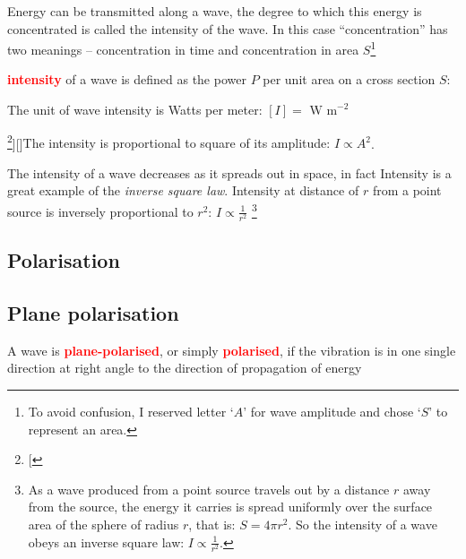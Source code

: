\documentclass[a4paper,12pt]{book}
\newcounter{example}[chapter]
\newcommand{\piste}{{\fontencoding{U}\fontfamily{futs}\selectfont\char 49\relax}}
\newenvironment{ilight}
  {\centering
  	\vspace*{6pt}
  	\begin{tcolorbox}[colframe=Gray,colback=LightGrey!15]
  \setlength{\baselineskip}{\baselineskip}%
  }
  {\end{tcolorbox}\vspace*{-4pt}}
\newcommand{\keypoint}[1]{\textbf{\textcolor{red}{#1}}}
\newcommand{\sidenote}[1]{\footnote{#1}}
\newcommand{\tcbhighmath}[1]{\boxed{#1}}
\newcommand{\piste}{\textsuperscript{$\star$}}
\newcommand{\keypoint}[1]{\textbf{\textcolor{red}{#1}}}
\begin{document}
Energy can be transmitted along a wave, the degree to which this energy is concentrated is called the intensity of the wave. In this case ``concentration'' has two meanings -- concentration in time and concentration in area $S$\footnote{To avoid confusion, I reserved letter `$A$' for wave amplitude and chose `$S$' to represent an area.}

\begin{ilight}
	\centering \keypoint{intensity} of a wave is defined as the power $P$ per unit area on a cross section $S$: \index{wave intensity}
\end{ilight}

The unit of wave intensity is Watts per meter: $[I] = ^{-2}$

\sidenote[][]{\piste The intensity is proportional to square of its amplitude: $\boxed{I \propto A^2}$}.

The intensity of a wave decreases as it spreads out in space, in fact Intensity is a great example of the \emph{inverse square law}. Intensity at distance of $r$ from a point source is inversely proportional to $r^2$: $\tcbhighmath{I \propto \frac{1}{r^2}}$
\footnote{As a wave produced from a point source travels out by a distance $r$ away from the source, the energy it carries is spread uniformly over the surface area of the sphere of radius $r$, that is: $S=4\pi r^2$. So the intensity of a wave obeys an inverse square law: $I \propto \frac{1}{r^2}$.}

\subsection{Polarisation}

\subsection{Plane polarisation}

\begin{ilight}
	A wave is \keypoint{plane-polarised}, or simply \keypoint{polarised}, if the vibration is in one single direction at right angle to the direction of propagation of energy
\end{ilight}
\end{document}
